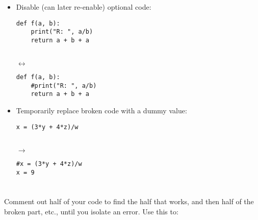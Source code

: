 \documentclass{handout}
\begin{document}
\begin{multicols}{2}
\begin{itemize}
\item Disable (can later re-enable) optional code: \\
\noindent
\begin{minipage}[t]{0.42\columnwidth}
\begin{lstlisting}
def f(a, b):
    print("R: ", a/b)
    return a + b + a
\end{lstlisting}
\end{minipage}
\begin{minipage}[t]{0.05\columnwidth}
\  \\
\hspace*{1ex}$\leftrightarrow$
\end{minipage}
\begin{minipage}[t]{0.42\columnwidth}
\begin{lstlisting}
def f(a, b):
    #print("R: ", a/b)
    return a + b + a
\end{lstlisting}
\end{minipage}

\item Temporarily replace broken code with a dummy value: \\
\noindent
\begin{minipage}[t]{0.42\columnwidth}
\begin{lstlisting}
x = (3*y + 4*z)/w
\end{lstlisting}
\end{minipage}
\begin{minipage}[t]{0.05\columnwidth}
\  \\
\hspace*{1ex}$\rightarrow$
\end{minipage}
\begin{minipage}[t]{0.42\columnwidth}
\begin{lstlisting}
#x = (3*y + 4*z)/w
x = 9
\end{lstlisting}
\end{minipage}

\end{itemize}


\section{}

Comment out half of your code to find the half that works, and then half of the broken part, etc., until you isolate an error. Use this to:

\begin{itemize}


\end{itemize}
\end{multicols}
\end{document}

